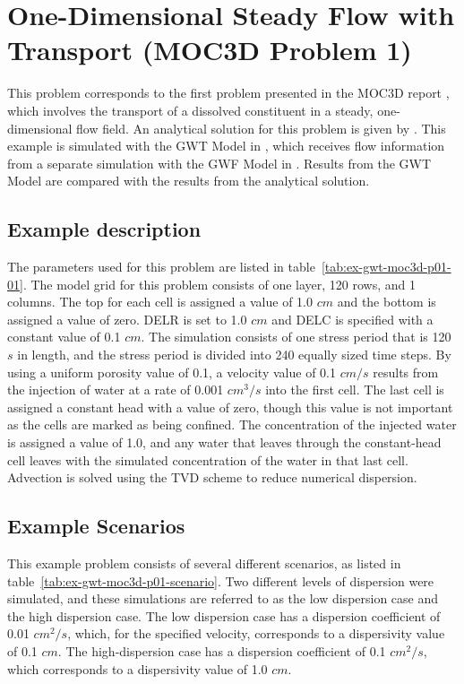 \section{One-Dimensional Steady Flow with Transport (MOC3D Problem 1)}

This problem corresponds to the first problem presented in the MOC3D report \cite{konikow1996three}, which involves the transport of a dissolved constituent in a steady, one-dimensional flow field.  An analytical solution for this problem is given by \cite{wexler1992}.  This example is simulated with the GWT Model in \mf, which receives flow information from a separate simulation with the GWF Model in \mf.  Results from the GWT Model are compared with the results from the \cite{wexler1992} analytical solution.  

\subsection{Example description}

The parameters used for this problem are listed in table~\ref{tab:ex-gwt-moc3d-p01-01}.  The model grid for this problem consists of one layer, 120 rows, and 1 columns.  The top for each cell is assigned a value of 1.0 $cm$ and the bottom is assigned a value of zero.  DELR is set to 1.0 $cm$ and DELC is specified with a constant value of 0.1 $cm$.  The simulation consists of one stress period that is 120 $s$ in length, and the stress period is divided into 240 equally sized time steps.  By using a uniform porosity value of 0.1, a velocity value of 0.1 $cm/s$ results from the injection of water at a rate of 0.001 $cm^3/s$ into the first cell.  The last cell is assigned a constant head with a value of zero, though this value is not important as the cells are marked as being confined.  The concentration of the injected water is assigned a value of 1.0, and any water that leaves through the constant-head cell leaves with the simulated concentration of the water in that last cell.   Advection is solved using the TVD scheme to reduce numerical dispersion.



\subsection{Example Scenarios}

This example problem consists of several different scenarios, as listed in table~\ref{tab:ex-gwt-moc3d-p01-scenario}.  Two different levels of dispersion were simulated, and these simulations are referred to as the low dispersion case and the high dispersion case.  The low dispersion case has a dispersion coefficient of 0.01 $cm^2/s$, which, for the specified velocity, corresponds to a dispersivity value of 0.1 $cm$.  The high-dispersion case has a dispersion coefficient of 0.1 $cm^2/s$, which corresponds to a dispersivity value of 1.0 $cm$.

